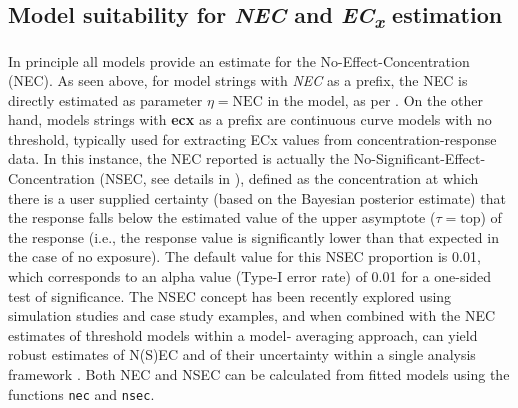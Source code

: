 \documentclass[
  shortnames]{jss}
\begin{document}
\subsection[Model suitability for NEC and ECx estimation]{Model suitability for \textit{NEC} and \textit{EC\textsubscript{x}} estimation}\label{modsuit}

In principle all models provide an estimate for the No-Effect-Concentration (NEC). As seen above, for model strings with \emph{NEC} as a prefix, the NEC is directly estimated as parameter \(\eta = \text{NEC}\) in the model, as per \citep{Fox2010}. On the other hand, models strings with \textbf{ecx} as a prefix are continuous curve models with no threshold, typically used for extracting ECx values from concentration-response data. In this instance, the NEC reported is actually the No-Significant-Effect-Concentration (NSEC, see details in \citet{Fisher2023}), defined as the concentration at which there is a user supplied certainty (based on the Bayesian posterior estimate) that the response falls below the estimated value of the upper asymptote (\(\tau = \text{top}\)) of the response (i.e., the response value is significantly lower than that expected in the case of no exposure). The default value for this NSEC proportion is 0.01, which corresponds to an alpha value (Type-I error rate) of 0.01 for a one-sided test of significance. The NSEC concept has been recently explored using simulation studies and case study examples, and when combined with the NEC estimates of threshold models within a model‐
averaging approach, can yield robust estimates of N(S)EC and of their uncertainty within a single
analysis framework \citep{fisher2023ieam}. Both NEC and NSEC can be calculated from fitted models using the functions \texttt{nec} and \texttt{nsec}.
\end{document}
